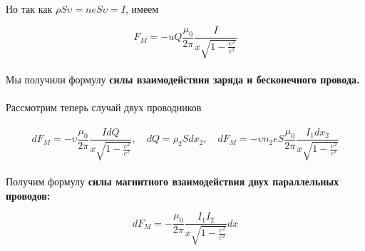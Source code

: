 \documentclass{article}
\begin{document}
Но так как $\rho S\upsilon = neS\upsilon = I$, имеем

\begin{equation*}
  F_M = -uQ\frac{\mu_0}{2\pi}\frac{I}{x\sqrt{1-\frac{\upsilon^2}{c^2}}}
\end{equation*}
\paragraph{}

Мы получили формулу \textbf{силы взаимодействия заряда и бесконечного провода.}

\paragraph{}

Рассмотрим теперь случай двух проводников

\noindent{}
\paragraph{}

\begin{equation*}
  dF_M = -\upsilon\frac{\mu_0}{2\pi} \frac{IdQ}{x\sqrt{1-\frac{\upsilon^2}{c^2}}}, \quad dQ = \rho_2Sdx_2,
  \quad dF_M = -\upsilon n_2eS\frac{\mu_0}{2\pi} \frac{I_1dx_2}{x\sqrt{1-\frac{\upsilon^2}{c^2}}}
\end{equation*}
\paragraph{}

Получим формулу \textbf{силы магнитного взаимодействия двух параллельных проводов:}

\begin{equation*}
  dF_M = -\frac{\mu_0}{2\pi} \frac{I_1I_2}{x\sqrt{1-\frac{\upsilon^2}{c^2}}} dx
\end{equation*}
\end{document}
